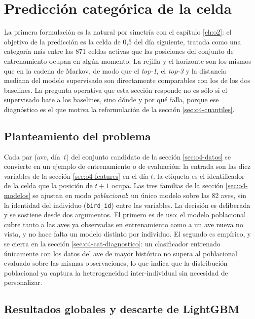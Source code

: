 \section{Predicción categórica de la celda}
\label{sec:o4-categorica}

La primera formulación es la natural por simetría con el capítulo \ref{ch:o2}: el
objetivo de la predicción es la celda de 0,5\textdegree{} del día siguiente, tratada
como una categoría más entre las 871 celdas activas que las posiciones del conjunto
de entrenamiento ocupan en algún momento. La rejilla y el horizonte son los mismos
que en la cadena de Markov, de modo que el \textit{top-1}, el \textit{top-3} y la
distancia mediana del modelo supervisado son directamente comparables con los de los
dos baselines. La pregunta operativa que esta sección responde no es sólo si el
supervisado bate a los baselines, sino dónde y por qué falla, porque ese diagnóstico
es el que motiva la reformulación de la sección \ref{sec:o4-cuantiles}.

\subsection{Planteamiento del problema}
\label{sec:o4-cat-planteamiento}

Cada par (ave, día~$t$) del conjunto candidato de la sección \ref{sec:o4-datos} se
convierte en un ejemplo de entrenamiento o de evaluación: la entrada son las diez
variables de la sección \ref{sec:o4-features} en el día $t$, la etiqueta es el
identificador de la celda que la posición de $t+1$ ocupa. Las tres familias de la
sección \ref{sec:o4-modelos} se ajustan en modo \emph{poblacional}: un único modelo
sobre las 82 aves, sin la identidad del individuo (\texttt{bird\_id}) entre las
variables. La decisión es deliberada y se sostiene desde dos argumentos. El primero
es de uso: el modelo poblacional cubre tanto a las aves ya observadas en
entrenamiento como a un ave nueva no vista, y no hace falta un modelo distinto por
individuo. El segundo es empírico, y se cierra en la sección
\ref{sec:o4-cat-diagnostico}: un clasificador entrenado únicamente con los datos del
ave de mayor histórico no supera al poblacional evaluado sobre las mismas
observaciones, lo que indica que la distribución poblacional ya captura la
heterogeneidad inter-individual sin necesidad de personalizar.

\subsection{Resultados globales y descarte de LightGBM}
\label{sec:o4-cat-globales}

